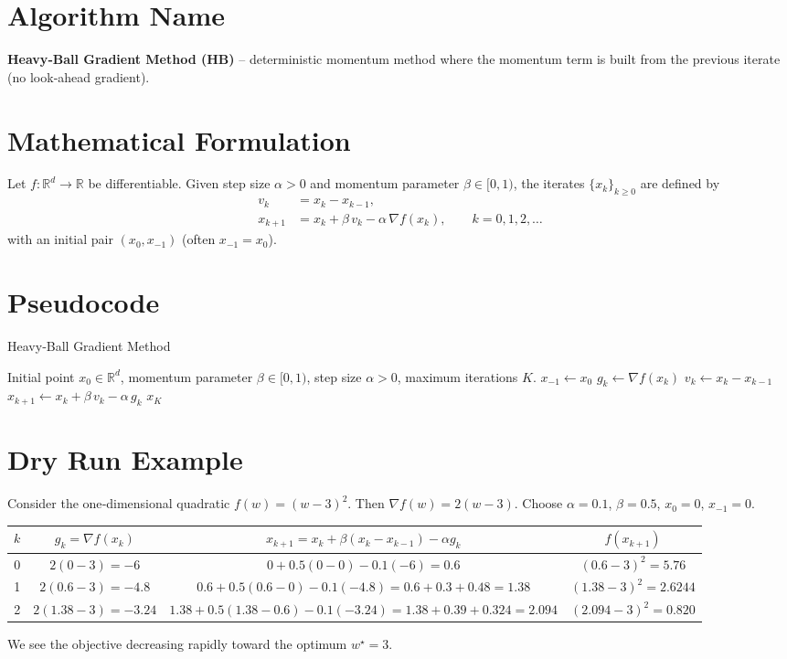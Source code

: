 \documentclass{article}
\begin{document}
\section*{Algorithm Name}
\textbf{Heavy‑Ball Gradient Method (HB)} – deterministic momentum method where the momentum term is built from the previous iterate (no look‑ahead gradient).

\section*{Mathematical Formulation}
Let $f:\mathbb{R}^d\rightarrow\mathbb{R}$ be differentiable.  
Given step size $\alpha>0$ and momentum parameter $\beta\in[0,1)$, the iterates $\{x_k\}_{k\ge 0}$ are defined by  
\[
\boxed{
\begin{aligned}
v_{k} &= x_{k}-x_{k-1},\\
x_{k+1} &= x_{k} + \beta\,v_{k} - \alpha\,\nabla f(x_{k}),\qquad k=0,1,2,\dots
\end{aligned}}
\]
with an initial pair $(x_{0},x_{-1})$ (often $x_{-1}=x_{0}$).

\section*{Pseudocode}
\begin{algorithm}[H]
\caption{Heavy‑Ball Gradient Method}
\begin{algorithmic}[1]
\Require Initial point $x_0\in\mathbb{R}^d$, momentum parameter $\beta\in[0,1)$, step size $\alpha>0$, maximum iterations $K$.
\State $x_{-1}\gets x_0$ 
    \State $g_k \gets \nabla f(x_k)$
    \State $v_k \gets x_k - x_{k-1}$
    \State $x_{k+1} \gets x_k + \beta\,v_k - \alpha\,g_k$
\EndFor
\State \Return $x_K$
\end{algorithmic}
\end{algorithm}

\section*{Dry Run Example}
Consider the one‑dimensional quadratic $f(w)=(w-3)^2$.  
Then $\nabla f(w)=2(w-3)$. Choose $\alpha=0.1$, $\beta=0.5$, $x_{0}=0$, $x_{-1}=0$.

\begin{center}
\begin{tabular}{c|c|c|c}
$k$ & $g_k=\nabla f(x_k)$ & $x_{k+1}=x_k+\beta(x_k-x_{k-1})-\alpha g_k$ & $f(x_{k+1})$\\ \hline
0 & $2(0-3)=-6$ & $0+0.5(0-0)-0.1(-6)=0.6$ & $(0.6-3)^2=5.76$\\
1 & $2(0.6-3)=-4.8$ & $0.6+0.5(0.6-0)-0.1(-4.8)=0.6+0.3+0.48=1.38$ & $(1.38-3)^2=2.6244$\\
2 & $2(1.38-3)=-3.24$ & $1.38+0.5(1.38-0.6)-0.1(-3.24)=1.38+0.39+0.324=2.094$ & $(2.094-3)^2=0.820$\\
\end{tabular}
\end{center}
We see the objective decreasing rapidly toward the optimum $w^\star=3$.
\end{document}
